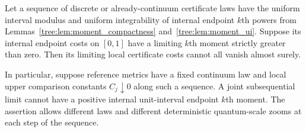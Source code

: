 \begin{lemma}
\label{tree:lem:nonzero_local_cost}
Let a sequence of discrete or already-continuum certificate laws
have the uniform interval modulus and uniform integrability of
internal endpoint $k$th powers from
Lemmas~\ref{tree:lem:moment_compactness} and~\ref{tree:lem:moment_ui}.
Suppose its internal endpoint costs on $[0,1]$ have a limiting
$k$th moment strictly greater than zero.  Then its limiting local
certificate costs cannot all vanish almost surely.

In particular, suppose reference metrics have a fixed continuum
law and local upper comparison constants $C_j\downarrow0$ along
such a sequence.  A joint subsequential limit cannot have a
positive internal unit-interval endpoint $k$th moment.  The assertion
allows different laws and different deterministic quantum-scale
zooms at each step of the sequence.
\end{lemma}

